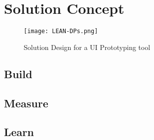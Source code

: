 \clearpage
\section{Solution Concept}
\label{design:section:solutionconcept}

\begin{figure}[htbp!]
  \centering    
  \texttt{[image: LEAN-DPs.png]}
  \caption[Solution Design]{Solution Design for a UI Prototyping tool}
  \label{fig:design:lean}
\end{figure}

\subsection{Build}
\label{design:section:build}

\subsection{Measure}
\label{design:section:measure}
\subsection{Learn}
\label{design:section:learn}